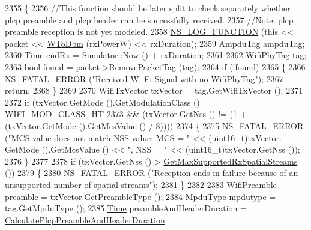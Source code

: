 \begin{DoxyCode}
2355 \{
2356   \textcolor{comment}{//This function should be later split to check separately whether plcp preamble and plcp header can be
       successfully received.}
2357   \textcolor{comment}{//Note: plcp preamble reception is not yet modeled.}
2358   \hyperlink{log-macros-disabled_8h_a90b90d5bad1f39cb1b64923ea94c0761}{NS\_LOG\_FUNCTION} (\textcolor{keyword}{this} << packet << \hyperlink{namespacens3_a256abf4ba6bab6e20f8419fff00e73e2}{WToDbm} (rxPowerW) << rxDuration);
2359   AmpduTag ampduTag;
2360   \hyperlink{namespacens3_1_1TracedValueCallback_a7ffd3e7c142ffe7c8a1d2db9b8de38ec}{Time} endRx = \hyperlink{classns3_1_1Simulator_ac3178fa975b419f7875e7105be122800}{Simulator::Now} () + rxDuration;
2361 
2362   WifiPhyTag tag;
2363   \textcolor{keywordtype}{bool} found = packet->\hyperlink{classns3_1_1Packet_a078fe922d976a417ab25ba2f3c2fd667}{RemovePacketTag} (tag);
2364   \textcolor{keywordflow}{if} (!found)
2365     \{
2366       \hyperlink{group__fatal_ga5131d5e3f75d7d4cbfd706ac456fdc85}{NS\_FATAL\_ERROR} (\textcolor{stringliteral}{"Received Wi-Fi Signal with no WifiPhyTag"});
2367       \textcolor{keywordflow}{return};
2368     \}
2369 
2370   WifiTxVector txVector = tag.GetWifiTxVector ();
2371 
2372   \textcolor{keywordflow}{if} (txVector.GetMode ().GetModulationClass () == \hyperlink{namespacens3_aa999e1221606a2b21b1eb33c2007c217a6ac45cac36cc4454649435d24ebf349c}{WIFI\_MOD\_CLASS\_HT}
2373       && (txVector.GetNss () != (1 + (txVector.GetMode ().GetMcsValue () / 8))))
2374     \{
2375       \hyperlink{group__fatal_ga5131d5e3f75d7d4cbfd706ac456fdc85}{NS\_FATAL\_ERROR} (\textcolor{stringliteral}{"MCS value does not match NSS value: MCS = "} << (uint16\_t)txVector.
      GetMode ().GetMcsValue () << \textcolor{stringliteral}{", NSS = "} << (uint16\_t)txVector.GetNss ());
2376     \}
2377 
2378   \textcolor{keywordflow}{if} (txVector.GetNss () > \hyperlink{classns3_1_1WifiPhy_a493d72ea8ba91bb2fda9185c39c419c8}{GetMaxSupportedRxSpatialStreams} ())
2379     \{
2380       \hyperlink{group__fatal_ga5131d5e3f75d7d4cbfd706ac456fdc85}{NS\_FATAL\_ERROR} (\textcolor{stringliteral}{"Reception ends in failure because of an unsupported number of spatial
       streams"});
2381     \}
2382 
2383   \hyperlink{group__wifi_ga5e94a56cb338a14ffbbb19c6a41251eb}{WifiPreamble} preamble = txVector.GetPreambleType ();
2384   \hyperlink{namespacens3_ae617d41bbd0c07fa58ee2306f687b055}{MpduType} mpdutype = tag.GetMpduType ();
2385   \hyperlink{namespacens3_1_1TracedValueCallback_a7ffd3e7c142ffe7c8a1d2db9b8de38ec}{Time} preambleAndHeaderDuration = \hyperlink{classns3_1_1WifiPhy_ac308f6020523524aaf1feb20565ce339}{CalculatePlcpPreambleAndHeaderDuration}

\end{DoxyCode}
